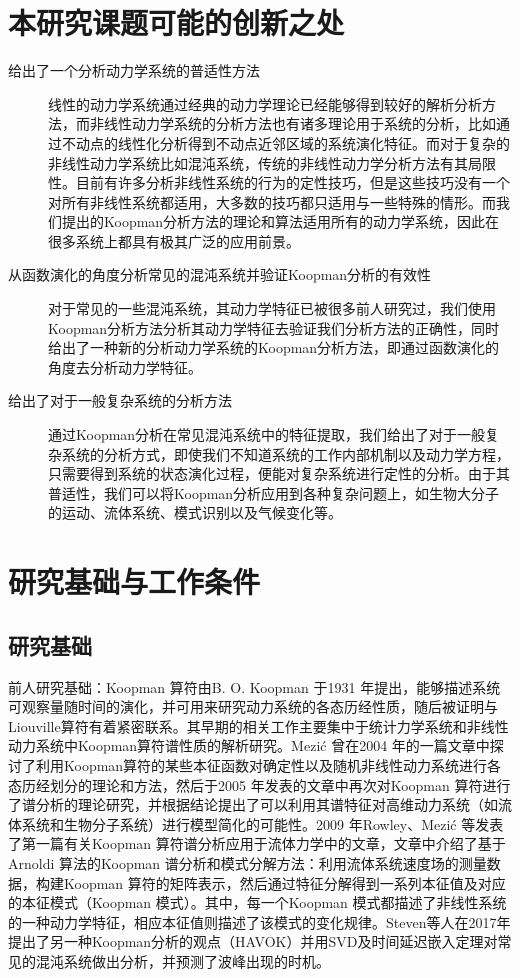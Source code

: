 \section{本研究课题可能的创新之处}
\begin{description}
    \item[给出了一个分析动力学系统的普适性方法]

    线性的动力学系统通过经典的动力学理论已经能够得到较好的解析分析方法，而非线性动力学系统的分析方法也有诸多理论用于系统的分析，比如通过不动点的线性化分析得到不动点近邻区域的系统演化特征。而对于复杂的非线性动力学系统比如混沌系统，传统的非线性动力学分析方法有其局限性。目前有许多分析非线性系统的行为的定性技巧，但是这些技巧没有一个对所有非线性系统都适用，大多数的技巧都只适用与一些特殊的情形。而我们提出的Koopman分析方法的理论和算法适用所有的动力学系统，因此在很多系统上都具有极其广泛的应用前景。

    \item[从函数演化的角度分析常见的混沌系统并验证Koopman分析的有效性]
     
    对于常见的一些混沌系统，其动力学特征已被很多前人研究过，我们使用Koopman分析方法分析其动力学特征去验证我们分析方法的正确性，同时给出了一种新的分析动力学系统的Koopman分析方法，即通过函数演化的角度去分析动力学特征。

    \item[给出了对于一般复杂系统的分析方法]
     
    通过Koopman分析在常见混沌系统中的特征提取，我们给出了对于一般复杂系统的分析方式，即使我们不知道系统的工作内部机制以及动力学方程，只需要得到系统的状态演化过程，便能对复杂系统进行定性的分析。由于其普适性，我们可以将Koopman分析应用到各种复杂问题上，如生物大分子的运动、流体系统、模式识别以及气候变化等。
 
\end{description}

\section{研究基础与工作条件}
\subsection{研究基础}
前人研究基础：Koopman 算符由B. O. Koopman 于1931 年提出，能够描述系统可观察量随时间的演化，并可用来研究动力系统的各态历经性质，随后被证明与Liouville算符有着紧密联系。其早期的相关工作主要集中于统计力学系统和非线性动力系统中Koopman算符谱性质的解析研究。Mezić 曾在2004 年的一篇文章中探讨了利用Koopman算符的某些本征函数对确定性以及随机非线性动力系统进行各态历经划分的理论和方法，然后于2005 年发表的文章中再次对Koopman 算符进行了谱分析的理论研究，并根据结论提出了可以利用其谱特征对高维动力系统（如流体系统和生物分子系统）进行模型简化的可能性。2009 年Rowley、Mezić 等发表了第一篇有关Koopman 算符谱分析应用于流体力学中的文章，文章中介绍了基于Arnoldi 算法的Koopman 谱分析和模式分解方法：利用流体系统速度场的测量数据，构建Koopman 算符的矩阵表示，然后通过特征分解得到一系列本征值及对应的本征模式（Koopman 模式）。其中，每一个Koopman 模式都描述了非线性系统的一种动力学特征，相应本征值则描述了该模式的变化规律。Steven等人在2017年提出了另一种Koopman分析的观点（HAVOK）并用SVD及时间延迟嵌入定理对常见的混沌系统做出分析，并预测了波峰出现的时机。

